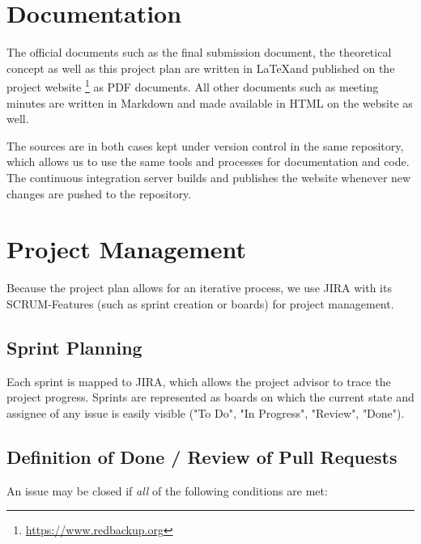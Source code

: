 \section{Documentation}
The official documents such as the final submission document, the theoretical concept as well as this project plan are written in \LaTeX and published on the project website \footnote{\url{https://www.redbackup.org}} as PDF documents. All other documents such as meeting minutes are written in Markdown and made available in HTML on the website as well.

The sources are in both cases kept under version control in the same repository, which allows us to use the same tools and processes for documentation and code. The continuous integration server builds and publishes the website whenever new changes are pushed to the repository.

\section{Project Management}
Because the project plan allows for an iterative process, we use JIRA with its SCRUM-Features (such as sprint creation or boards) for project management.

\subsection{Sprint Planning}
Each sprint is mapped to JIRA, which allows the project advisor to trace the project progress. Sprints are represented as boards on which the current state and assignee of any issue is easily visible ("To Do", "In Progress", "Review", "Done").


\subsection{Definition of Done / Review of Pull Requests}
An issue may be closed if \emph{all} of the following conditions are met:

